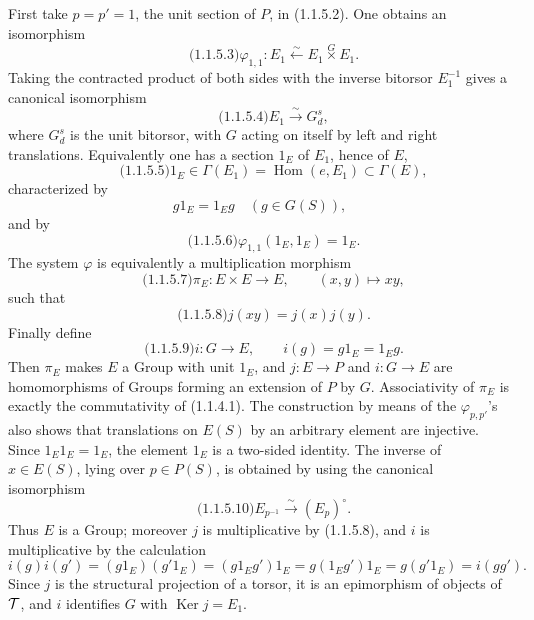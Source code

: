 \documentclass[11pt]{article}
\providecommand{\Ker}{\operatorname{Ker}}
\begin{document}
First take \(p=p'=1\), the unit section of \(P\), in (1.1.5.2).  One obtains an isomorphism
\begin{equation}\qquad\text{(1.1.5.3)}
  \varphi_{1,1}:E_1\xleftarrow{\sim}E_1\overset{G}{\times}E_1.
\end{equation}
Taking the contracted product of both sides with the inverse bitorsor \(E_1^{-1}\) gives a canonical isomorphism
\begin{equation}\qquad\text{(1.1.5.4)}
  E_1\xrightarrow{\sim}G_d^s,
\end{equation}
where \(G_d^s\) is the unit bitorsor, with \(G\) acting on itself by left and right translations.  Equivalently one has a section \(1_E\) of \(E_1\), hence of \(E\),
\begin{equation}\qquad\text{(1.1.5.5)}
  1_E\in\Gamma(E_1)=\operatorname{Hom}(e,E_1)\subset\Gamma(E),
\end{equation}
characterized by
\[
  g1_E=1_Eg\quad(g\in G(S)),
\]
and by
\begin{equation}\qquad\text{(1.1.5.6)}
  \varphi_{1,1}(1_E,1_E)=1_E.
\end{equation}
The system \(\varphi\) is equivalently a multiplication morphism
\begin{equation}\qquad\text{(1.1.5.7)}
  \pi_E:E\times E\longrightarrow E,\qquad (x,y)\longmapsto xy,
\end{equation}
such that
\begin{equation}\qquad\text{(1.1.5.8)}
  j(xy)=j(x)j(y).
\end{equation}
Finally define
\begin{equation}\qquad\text{(1.1.5.9)}
  i:G\longrightarrow E,\qquad i(g)=g1_E=1_Eg.
\end{equation}
Then \(\pi_E\) makes \(E\) a Group with unit \(1_E\), and \(j:E\to P\) and \(i:G\to E\) are homomorphisms of Groups forming an extension of \(P\) by \(G\).  Associativity of \(\pi_E\) is exactly the commutativity of (1.1.4.1).  The construction by means of the \(\varphi_{p,p'}\)'s also shows that translations on \(E(S)\) by an arbitrary element are injective.  Since \(1_E1_E=1_E\), the element \(1_E\) is a two-sided identity.  The inverse of \(x\in E(S)\), lying over \(p\in P(S)\), is obtained by using the canonical isomorphism
\begin{equation}\qquad\text{(1.1.5.10)}
  E_{p^{-1}}\xrightarrow{\sim}(E_p)^\circ.
\end{equation}
Thus \(E\) is a Group; moreover \(j\) is multiplicative by (1.1.5.8), and \(i\) is multiplicative by the calculation
\[
  i(g)i(g')=(g1_E)(g'1_E)=(g1_Eg')1_E=g(1_Eg')1_E=g(g'1_E)=i(gg').
\]
Since \(j\) is the structural projection of a torsor, it is an epimorphism of objects of \(\mathcal T\), and \(i\) identifies \(G\) with \(\Ker j=E_1\).
\end{document}
